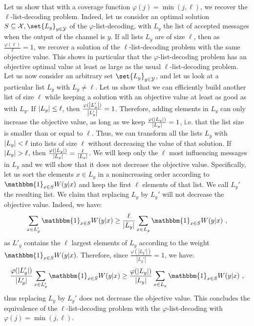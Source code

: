 Let us show that with a coverage function $\varphi(j) = \min(j,\ell)$, we recover the $\ell$-list-decoding problem. Indeed, let us consider an optimal solution $S \subseteq \mathcal{X},\set{L_y}_{y \in \mathcal{Y}}$ of the $\varphi$-list-decoding, with $L_y$ the list of accepted messages when the output of the channel is $y$. If all lists $L_y$ are of size $\ell$, then as $\frac{\varphi(\ell)}{\ell} = 1$, we recover a solution of the $\ell$-list-decoding problem with the same objective value. This shows in particular that the $\varphi$-list-decoding problem has an objective optimal value at least as large as the usual $\ell$-list-decoding problem. Let us now consider an arbitrary set $\set{L_y}_{y \in \mathcal{Y}}$, and let us look at a particular list $L_y$ with $L_y \not= \ell$. Let us show that we can efficiently build another list of size $\ell$ while keeping a solution with an objective value at least as good as with $L_y$. If $\abs{L_y} \leq \ell$, then $\frac{\varphi(\abs{L'_y})}{\abs{L'_y}} = 1$. Therefore, adding elements in $L_y$ can only increase the objective value, as long as we keep $\frac{\varphi(\abs{L_y})}{\abs{L_y}} = 1$, i.e. that the list size is smaller than or equal to $\ell$. Thus, we can transform all the lists $L_y$ with $\abs{L_y} < \ell$ into lists of size $\ell$ without decreasing the value of that solution. If $\abs{L_y} > \ell$, then $\frac{\varphi(\abs{L_y})}{\abs{L_y}} = \frac{\ell}{\abs{L_y}}$. We will keep only the $\ell$ most influencing messages in $L_y$ and we will show that it does not decrease the objective value. Specifically, let us sort the elements $x \in L_y$ in a nonincreasing order according to $\mathbbm{1}_{x \in S}W(y|x)$ and keep the first $\ell$ elements of that list. We call $L_y'$ the resulting list. We claim that replacing $L_y$ by $L_y'$ will not decrease the objective value. Indeed, we have:
\[ \sum_{x \in L'_y}\mathbbm{1}_{x \in S}W(y|x) \geq \frac{\ell}{|L_y|} \sum_{x \in L_y}\mathbbm{1}_{x \in S}W(y|x) \ ,\]
as $L'_y$ contains the $\ell$ largest elements of $L_y$ according to the weight $\mathbbm{1}_{x \in S}W(y|x)$. Therefore, since $\frac{\varphi(|L_y'|)}{|L_y'|} = 1$, we have:
\[ \frac{\varphi(|L_y'|)}{|L_y'|}\sum_{x \in L'_y}\mathbbm{1}_{x \in S}W(y|x) \geq \frac{\varphi(|L_y|)}{|L_y|} \sum_{x \in L_y}\mathbbm{1}_{x \in S}W(y|x) \ ,\]
thus replacing $L_y$ by $L_y'$ does not decrease the objective value. This concludes the equivalence of the $\ell$-list-decoding problem with the $\varphi$-list-decoding with $\varphi(j) = \min(j,\ell)$.

